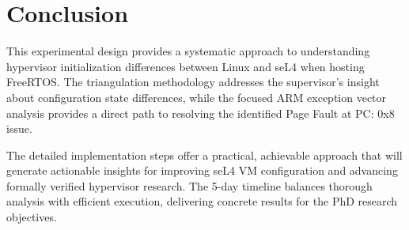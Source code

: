 \documentclass[11pt,a4paper]{article}
\begin{document}
\section{Conclusion}

This experimental design provides a systematic approach to understanding hypervisor initialization differences between Linux and seL4 when hosting FreeRTOS. The triangulation methodology addresses the supervisor's insight about configuration state differences, while the focused ARM exception vector analysis provides a direct path to resolving the identified Page Fault at PC: 0x8 issue.

The detailed implementation steps offer a practical, achievable approach that will generate actionable insights for improving seL4 VM configuration and advancing formally verified hypervisor research. The 5-day timeline balances thorough analysis with efficient execution, delivering concrete results for the PhD research objectives.
\end{document}

